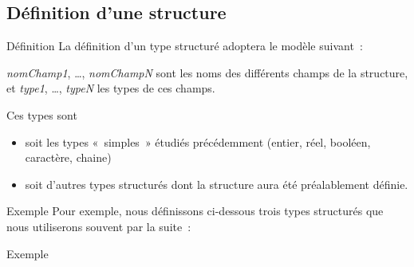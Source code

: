 \subsection{Définition d'une structure}

\begin{frame}{Définition}
	La définition d’un type structuré adoptera le modèle suivant~:

	\bigskip
	

	\bigskip
	
	\textit{nomChamp1}, \dots, \textit{nomChampN }
	sont les noms des différents champs de la structure, 
	et \textit{type1}, \dots, \textit{typeN} 
	les types de ces champs. 
	
	\bigskip
	
	Ces types sont 
	\begin{itemize}
	\item
	soit les types «~simples~» étudiés
	précédemment (entier, réel, booléen, caractère, chaine) 
	\item
	soit d’autres
	types structurés dont la structure aura été préalablement définie.
	\end{itemize}
\end{frame}

\begin{frame}{Exemple}
	Pour exemple, nous définissons ci-dessous trois
	types structurés que nous utiliserons souvent par la suite~:

	\bigskip
	
\end{frame}

\begin{frame}{Exemple}

	\bigskip
	

\end{frame}

